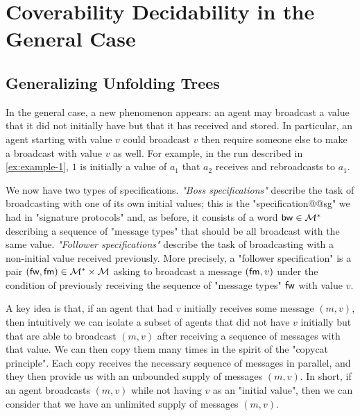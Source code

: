 
\section{Coverability Decidability in the General Case}
\label{sec:cover-general-case}

\subsection{Generalizing Unfolding Trees}
\label{sec:unfolding-trees-general}
In the general case, a new phenomenon appears: an agent may broadcast a value that it did not initially have but that it has received and stored. In particular, an agent starting with value $v$ could broadcast $v$ then require someone else to make a broadcast with value $v$ as well. For example, in the run described in \cref{ex:example-1}, $1$ is initially a value of $a_1$ that $a_2$ receives and rebroadcasts to $a_1$.

 We now have two types of specifications. \emph{"Boss specifications"} describe the task of broadcasting with one of its own initial values; this is the "specification@@sg" we had in "signature protocols" and, as before, it consists of a word $\mathsf{bw} \in \mathcal{M}^\ast$ describing a sequence of "message types" that should be all broadcast with the same value. \emph{"Follower specifications"} describe the task of broadcasting with a non-initial value received previously. More precisely, a "follower specification" is a pair $(\mathsf{fw}, \mathsf{fm}) \in \mathcal{M}^*\times \mathcal{M}$ asking to broadcast a message $(\mathsf{fm},v)$ under the condition of previously receiving the sequence of "message types" $\mathsf{fw}$ with value $v$.


A key idea is that, if an agent that had $v$ initially receives some message $(m,v)$, then intuitively we can isolate a subset of agents that did not have $v$ initially but that are able to broadcast $(m,v)$ after receiving a sequence of messages with that value. We can then copy them many times in the spirit of the "copycat principle". Each copy receives the necessary sequence of messages in parallel, and they then provide us with an unbounded supply of messages $(m,v)$. In short, if an agent broadcasts $(m,v)$ while not having $v$ as an "initial value", then we can consider that we have an unlimited supply of messages $(m,v)$.


